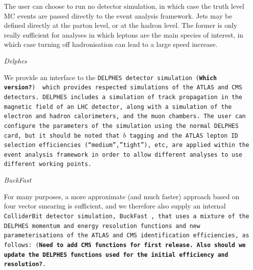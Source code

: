 The user can choose to run no detector simulation, in which case the truth level MC events are passed directly to the event analysis framework. Jets may be defined directly at the parton level, or at the hadron level. The former is only really sufficient for analyses in which leptons are the main species of interest, in which case turning off hadronisation can lead to a large speed increase.

\begin{center}
\emph{Delphes}\\
\end{center}

We provide an interface to the \tt DELPHES \rm detector simulation (\textbf{Which version?})~\cite{deFavereau:2013fsa,Ovyn:2009tx} which provides respected simulations of the ATLAS and CMS detectors. DELPHES includes a simulation of track propagation in the magnetic field of an LHC detector, along with a simulation of the electron and hadron calorimeters, and the muon chambers. The user can configure the parameters of the simulation using the normal DELPHES card, but it should be noted that $b$ tagging and the ATLAS lepton ID selection efficiencies (``medium'',''tight''), etc, are applied within the event analysis framework in order to allow different analyses to use different working points.

\begin{center}
\emph{BuckFast}\\
\end{center}

For many purposes, a more approximate (and much faster) approach based on four vector smearing is sufficient, and we therefore also supply an internal \tt ColliderBit \rm detector simulation, \tt BuckFast \rm, that uses a mixture of the DELPHES momentum and energy resolution functions and new parameterisations of the ATLAS and CMS identification efficiencies, as follows: (\textbf{Need to add CMS functions for first release. Also should we update the DELPHES functions used for the initial efficiency and resolution?}.  

